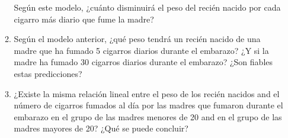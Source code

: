 \begin{enumerate}[leftmargin=*]
\begin{enumerate}
Según este modelo, ¿cuánto disminuirá el peso del recién nacido por cada cigarro más diario
que fume la madre? 
\item Según el modelo anterior, ¿qué peso tendrá un recién nacido de una madre que ha fumado 5 cigarros diarios durante
el embarazo? ¿Y si la madre ha fumado 30 cigarros diarios durante el embarazo? ¿Son fiables estas predicciones?
\item ¿Existe la misma relación lineal entre el peso de los recién nacidos and el número de cigarros fumados al día por
las madres que fumaron durante el embarazo en el grupo de las madres menores de 20 and en el grupo de las madres mayores de
20? ¿Qué se puede concluir?
\end{enumerate}
\end{enumerate}